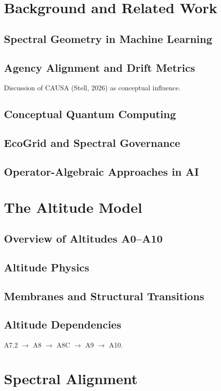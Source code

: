 \documentclass[11pt]{article}
\begin{document}
\section{Background and Related Work}
\subsection{Spectral Geometry in Machine Learning}
\subsection{Agency Alignment and Drift Metrics}
Discussion of CAUSA (Stell, 2026) as conceptual influence.
\subsection{Conceptual Quantum Computing}
\subsection{EcoGrid and Spectral Governance}
\subsection{Operator-Algebraic Approaches in AI}

\section{The Altitude Model}
\subsection{Overview of Altitudes A0--A10}
\subsection{Altitude Physics}
\subsection{Membranes and Structural Transitions}
\subsection{Altitude Dependencies}
A7.2 $\rightarrow$ A8 $\rightarrow$ A8C $\rightarrow$ A9 $\rightarrow$ A10.

\section{Spectral Alignment}
\end{document}
